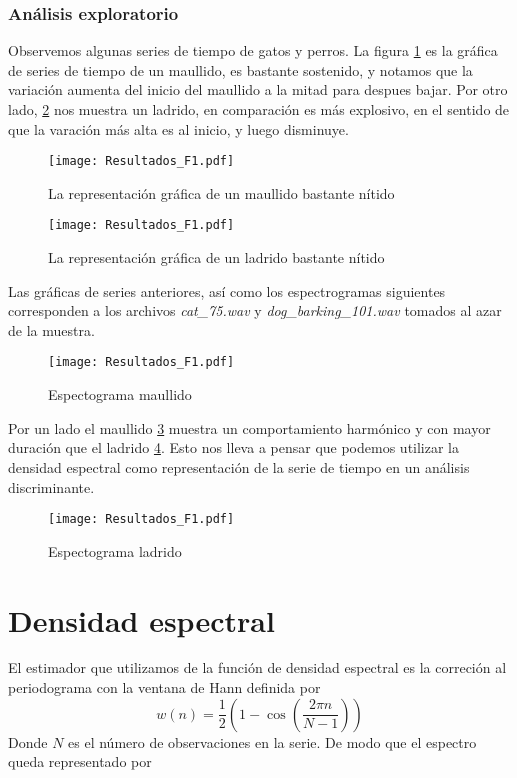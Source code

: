 \documentclass[twocolumn,10pt]{asme2ej}
\begin{document}
\subsubsection{An\'alisis exploratorio} %
\label{ssub:analisis_exploratorio}
Observemos algunas series de tiempo de gatos y perros. La figura \ref{plot:ts_maullido1} es la gr\'afica de series de tiempo de un maullido, es bastante sostenido, y notamos que la variaci\'on aumenta del inicio del maullido a la mitad para despues bajar. Por otro lado, \ref{plot:ts_ladrido1} nos muestra un ladrido, en comparaci\'on es m\'as explosivo, en el sentido de que la varaci\'on m\'as alta es al inicio, y luego disminuye.
\begin{figure}[h]
  \centering
    \texttt{[image: Resultados\_F1.pdf]}
  \caption{La representaci\'on gr\'afica de un maullido bastante n\'itido}
  \label{plot:ts_maullido1}
\end{figure}
\begin{figure}[h]
  \centering
    \texttt{[image: Resultados\_F1.pdf]}
  \caption{La representaci\'on gr\'afica de un ladrido bastante n\'itido}
  \label{plot:ts_ladrido1}
\end{figure}
Las gr\'aficas de series anteriores, as\'i como los espectrogramas siguientes corresponden a los archivos \textit{cat\_75.wav} y \textit{dog\_barking\_101.wav} tomados al azar de la muestra.\\
\begin{figure}[h]
  \centering
    \texttt{[image: Resultados\_F1.pdf]}
  \caption{Espectograma maullido}
  \label{plot:spec_maullido1}
\end{figure}
Por un lado el maullido \ref{plot:spec_maullido1} muestra un comportamiento harm\'onico y con mayor duraci\'on que el ladrido \ref{plot:spec_ladrido1}. Esto nos lleva a pensar que podemos utilizar la densidad espectral como representaci\'on de la serie de tiempo en un an\'alisis discriminante.
\begin{figure}[h]
  \centering
    \texttt{[image: Resultados\_F1.pdf]}
  \caption{Espectograma ladrido}
  \label{plot:spec_ladrido1}
\end{figure}

\section{Densidad espectral} %
\label{sec:densidad_espectral}
El estimador que utilizamos de la funci\'on de densidad espectral es la correci\'on al periodograma con la ventana de Hann definida por
$$
w(n)=\frac{1}{2}\left(1-\cos\left(\frac{2\pi n}{N-1}\right)\right)
$$
Donde $N$ es el n\'umero de observaciones en la serie. De modo que el espectro queda representado por
\end{document}
